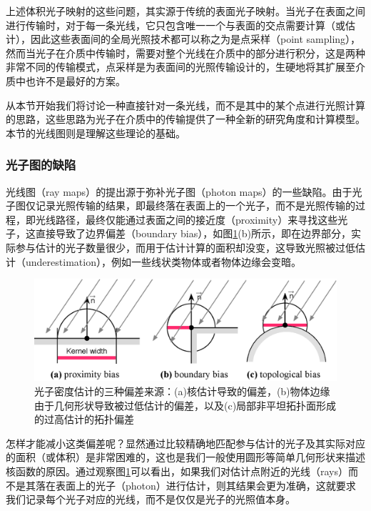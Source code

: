上述体积光子映射的这些问题，其实源于传统的表面光子映射。当光子在表面之间进行传输时，对于每一条光线，它只包含唯一一个与表面的交点需要计算（或估计），因此这些表面间的全局光照技术都可以称之为是点采样（point sampling），然而当光子在介质中传输时，需要对整个光线在介质中的部分进行积分，这是两种非常不同的传输模式，点采样是为表面间的光照传输设计的，生硬地将其扩展至介质中也许不是最好的方案。

从本节开始我们将讨论一种直接针对一条光线，而不是其中的某个点进行光照计算的思路，这些思路为光子在介质中的传输提供了一种全新的研究角度和计算模型。本节的光线图则是理解这些理论的基础。




\subsubsection{光子图的缺陷}
光线图（ray maps）\cite{a:RayMapsforGlobalIllumination}的提出源于弥补光子图（photon maps）的一些缺陷。由于光子图仅记录光照传输的结果，即最终落在表面上的一个光子，而不是光照传输的过程，即光线路径，最终仅能通过表面之间的接近度（proximity）来寻找这些光子，这直接导致了边界偏差（boundary bias），如图\ref{f:pm-biases}(b)所示，即在边界部分，实际参与估计的光子数量很少，而用于估计计算的面积却没变，这导致光照被过低估计（underestimation），例如一些线状类物体或者物体边缘会变暗。

\begin{figure}
	\includegraphics[width=\textwidth]{figures/pm/biases}
	\caption{光子密度估计的三种偏差来源：(a)核估计导致的偏差，(b)物体边缘由于几何形状导致被过低估计的偏差，以及(c)局部非平坦拓扑面形成的过高估计的拓扑偏差}
	\label{f:pm-biases}
\end{figure}

怎样才能减小这类偏差呢？显然通过比较精确地匹配参与估计的光子及其实际对应的面积（或体积）是非常困难的，这也是我们一般使用圆形等简单几何形状来描述核函数的原因。通过观察图\ref{f:pm-biases}可以看出，如果我们对估计点附近的光线（rays）而不是其落在表面上的光子（photon）进行估计，则其结果会更为准确，这就要求我们记录每个光子对应的光线，而不是仅仅是光子的光照值本身。

